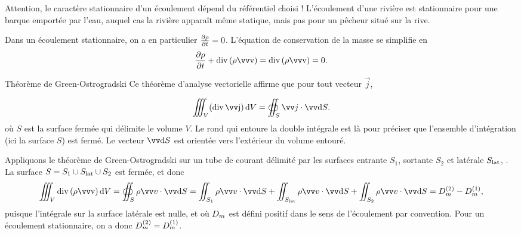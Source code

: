 \documentclass[12pt,fancy]{cours}
\begin{document}
\begin{remarque}
Attention, le caractère stationnaire d'un écoulement dépend du référentiel choisi ! L'écoulement d'une rivière est stationnaire pour une barque emportée par l'eau, auquel cas la rivière apparaît même statique, mais pas pour un pêcheur situé sur la rive.
\end{remarque}

Dans un écoulement stationnaire, on a en particulier $\frac{\partial{\rho}}{\partial{t}} = 0$. L'équation de conservation de la masse  se simplifie en
\begin{equation}
\dfrac{\partial \rho}{\partial t}+\Dive{(\rho \Vec{v})}=\Dive{(\rho \Vec{v})}=0.
\end{equation}

\begin{rappel}{Théorème de Green-Ostrogradski}
Ce théorème d'analyse vectorielle affirme que pour tout vecteur $\Vec{j}$,


\begin{equation}
\iiint_{V}(\Dive{\Vec{j}})\,\mathrm{d}V = \oiint_{S}\Vec{j}\cdot \Vec{\mathrm{d}S}.
\end{equation}
où $S$ est la surface fermée qui délimite le volume $V$. Le rond qui entoure la double intégrale est là pour préciser que l'ensemble d'intégration (ici la surface $S$) est fermé. Le vecteur $\dS$ est orientée vers l'extérieur du volume entouré.

\end{rappel}

Appliquons le théorème de Green-Ostrogradski sur un tube de courant délimité par les surfaces entrante $S_{1}$, sortante $S_{2}$ et latérale $S_{\rm lat}$, . La surface $S = S_{1} \cup S_{\rm lat} \cup S_{2}$ est fermée, et donc
\begin{equation}
  \iiint_{V}\Dive{(\rho\Vec{v})} \,\d V = \oiint_{S}\rho \Vec{v}\cdot \dS = \iint_{S_1}\rho \Vec{v}\cdot \dS + \iint_{S_{\rm lat}}\rho \Vec{v}\cdot \dS + \iint_{S_2}\rho \Vec{v}\cdot \dS = \Dm^{(\rm 2)} - \Dm^{(\rm 1)},
\end{equation}
puisque l'intégrale sur la surface latérale est nulle, et où $D_m$ est défini positif dans le sens de l'écoulement par convention. Pour un écoulement stationnaire, on a donc $D_m^{(\rm 2)} = D_m^{(\rm 1)}$.
\end{document}
